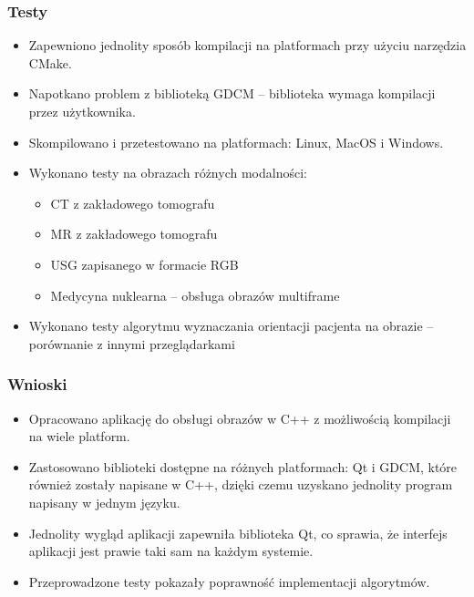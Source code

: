 \documentclass[aspectratio=169]{beamer}
\begin{document}
\begin{frame}
    \frametitle{Testy}
    \begin{itemize}
        \item Zapewniono jednolity sposób kompilacji na platformach przy użyciu narzędzia CMake.
        \item Napotkano problem z biblioteką GDCM -- biblioteka wymaga kompilacji przez użytkownika.
        \item Skompilowano i przetestowano na platformach: Linux, MacOS i Windows.
        \item Wykonano testy na obrazach różnych modalności:
              \begin{itemize}
                  \item CT z zakładowego tomografu
                  \item MR z zakładowego tomografu
                  \item USG zapisanego w formacie RGB
                  \item Medycyna nuklearna -- obsługa obrazów multiframe
              \end{itemize}
        \item Wykonano testy algorytmu wyznaczania orientacji pacjenta na obrazie -- porównanie z innymi przeglądarkami
    \end{itemize}

\end{frame}

\begin{frame}
    \frametitle{Wnioski}
    \begin{itemize}
        \item Opracowano aplikację do obsługi obrazów \DICOM w C++ z możliwością kompilacji na wiele platform.
        \item Zastosowano biblioteki dostępne na różnych platformach: Qt i GDCM, które również zostały napisane w C++, dzięki czemu uzyskano jednolity program napisany w jednym języku.
        \item Jednolity wygląd aplikacji zapewniła biblioteka Qt, co sprawia, że interfejs aplikacji jest prawie taki sam na każdym systemie.
        \item Przeprowadzone testy pokazały poprawność implementacji algorytmów.
    \end{itemize}

\end{frame}
\end{document}
